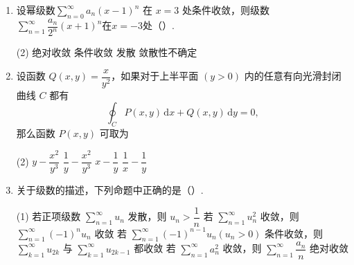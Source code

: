 \documentclass[../main.tex]{subfiles}
\begin{document}
\begin{enumerate}
\begin{minipage}[t]{0.93\linewidth}
          \begin{tasks}[label=\textbf{\Alph*.}, label-width=1.5em, column-sep=1em](2)
            \task （2）（4）
            \task （1）（3）
            \task （2）（3）
            \task （1）（4）
          \end{tasks}
        \end{minipage}

  \item 设幂级数$ \displaystyle\sum \limits_{n=0}^{\infty} a_n(x-1)^n $ 在 $ x = 3 $ 处条件收敛，则级数 $ \displaystyle\sum \limits_{n=1}^{\infty} \dfrac{a_n}{2^n}(x+1)^n$在$x=-3$处（\qquad）.

        \begin{tasks}[label=\textbf{\Alph*.}, label-width=1.5em, column-sep=1em](2)
          \task 绝对收敛
          \task 条件收敛
          \task 发散
          \task 敛散性不确定
        \end{tasks}

  \item 设函数 $Q(x,y)=\dfrac{x}{y^2}$，如果对于上半平面 $(y>0)$ 内的任意有向光滑封闭曲线 $C$ 都有
        \[
          \oint_C P(x,y)\,\mathrm{d}x + Q(x,y)\,\mathrm{d}y = 0,
        \]
        那么函数 $P(x,y)$ 可取为

        \begin{tasks}[label=\textbf{\Alph*.}, label-width=1.5em, column-sep=1em](2)
          \task $y-\dfrac{x^2}{y^3}$
          \task $\dfrac{1}{y}-\dfrac{x^2}{y^3}$
          \task $x-\dfrac{1}{y}$
          \task $\dfrac{1}{x}-\dfrac{1}{y}$
        \end{tasks}

  \item 关于级数的描述，下列命题中正确的是（\qquad）.

        \begin{tasks}[label=\textbf{\Alph*.}, label-width=1.5em, column-sep=1em](1)
          \task 若正项级数 \( \displaystyle \sum \limits_{n=1}^{\infty} u_n \) 发散，则 $u_n>\dfrac{1}{n}$
          \task 若 \( \displaystyle \sum \limits_{n=1}^{\infty} u_n^2 \) 收敛，则 \( \displaystyle \sum \limits_{n=1}^{\infty} (-1)^n u_n \) 收敛
          \task 若 \( \displaystyle \sum \limits_{n=1}^{\infty} (-1)^{n-1}u_n(u_n>0) \) 条件收敛，则 \( \displaystyle \sum \limits_{k=1}^{\infty} u_{2k} \) 与 \( \displaystyle \sum \limits_{k=1}^{\infty} u_{2k-1} \) 都收敛
          \task 若 \( \displaystyle \sum \limits_{n=1}^{\infty} a_n^2 \) 收敛，则 \( \displaystyle \sum \limits_{n=1}^{\infty} \dfrac{a_n}{n} \) 绝对收敛
        \end{tasks}
\end{enumerate}
\end{document}
